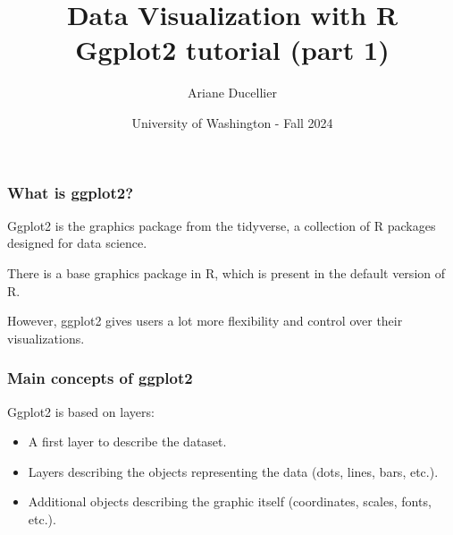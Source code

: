 \documentclass{beamer}
\title[Data Visualization with R - Ggplot2 tutorial (part 1)]{Data Visualization with R \\ Ggplot2 tutorial (part 1)}
\author{Ariane Ducellier}
\date{University of Washington - Fall 2024}
\begin{document}
	\begin{frame}
		\titlepage
	\end{frame}

	\begin{frame}
		\frametitle{What is ggplot2?}

		Ggplot2 is the graphics package from the tidyverse, a collection of R packages designed for data science. 

		\vspace{2em}

		There is a base graphics package in R, which is present in the default version of R.

		\vspace{2em}

		However, ggplot2 gives users a lot more flexibility and control over their visualizations.
		
	\end{frame}

	\begin{frame}
		\frametitle{Main concepts of ggplot2}

		Ggplot2 is based on layers:

		\vspace{2em}
		
		\begin{itemize}
		\setlength{\itemsep}{1em}
			\item A first layer to describe the dataset.
			\item Layers describing the objects representing the data (dots, lines, bars, etc.).
			\item Additional objects describing the graphic itself (coordinates, scales, fonts, etc.).
		\end{itemize}

	\end{frame}
\end{document}
